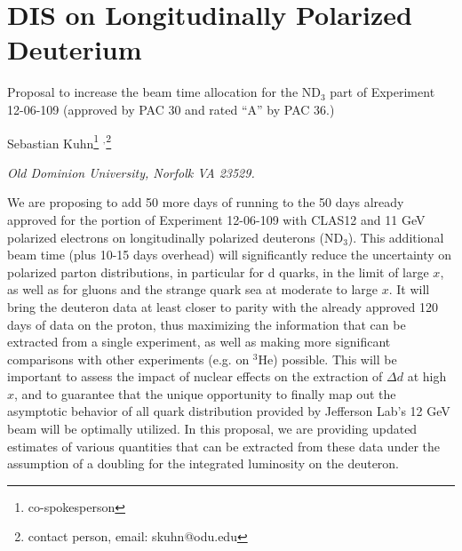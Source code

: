 \documentclass[12pt]{report}
\begin{document}
\chapter{DIS on Longitudinally Polarized Deuterium}
{\center Proposal to increase the beam time allocation for the ND$_3$ part of Experiment 12-06-109 (approved by PAC 30 and
rated ``A'' by PAC 36.)\\}
\centerline{Sebastian Kuhn\footnote{co-spokesperson} $^,$\footnote{contact person, email: skuhn@odu.edu}}
\centerline{\it  Old Dominion University, Norfolk VA 23529.}

\abstract
{We are proposing to add 50 more days of running to the 50 days already approved for 
the portion of Experiment 12-06-109 with CLAS12 and 11 GeV polarized electrons on 
longitudinally polarized  deuterons (ND$_3$). This additional beam time (plus 10-15 days overhead)
will significantly reduce the uncertainty on polarized parton distributions, in
particular for d quarks, in the limit of large $x$, as well as for gluons and the strange quark sea
at moderate to large $x$. It will bring the deuteron data at least closer to parity with the
already approved 120 days of data on the proton, thus maximizing the information 
that can be extracted from a single experiment, as well as making more significant comparisons
with other experiments (e.g. on $^3$He) possible. This will be important to assess the
impact of nuclear effects on the extraction of $\Delta d$ at high $x$, and to guarantee
that the unique opportunity to finally map out the asymptotic behavior of all quark distribution
provided by Jefferson Lab's 12 GeV beam will be optimally utilized. In this proposal,
we are providing updated estimates of various quantities that can be extracted from these
data under the assumption of a doubling for the integrated luminosity on the deuteron.
}
\end{document}
